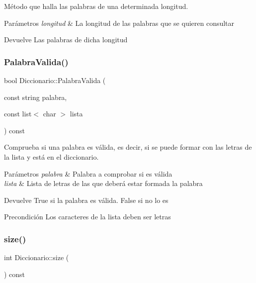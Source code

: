 Método que halla las palabras de una determinada longitud. 


\begin{DoxyParams}{Parámetros}
{\em longitud} & La longitud de las palabras que se quieren consultar \\
\hline
\end{DoxyParams}
\begin{DoxyReturn}{Devuelve}
Las palabras de dicha longitud 
\end{DoxyReturn}
\mbox{\label{classDiccionario_a8df85eb554f7539a5d690fd5b531627b}} 
\subsubsection{\texorpdfstring{Palabra\+Valida()}{PalabraValida()}}
{\footnotesize\ttfamily bool Diccionario\+::\+Palabra\+Valida (\begin{DoxyParamCaption}\item[{const string}]{palabra,  }\item[{const list$<$ char $>$}]{lista }\end{DoxyParamCaption}) const}



Comprueba si una palabra es válida, es decir, si se puede formar con las letras de la lista y está en el diccionario. 


\begin{DoxyParams}{Parámetros}
{\em palabra} & Palabra a comprobar si es válida \\
\hline
{\em lista} & Lista de letras de las que deberá estar formada la palabra \\
\hline
\end{DoxyParams}
\begin{DoxyReturn}{Devuelve}
True si la palabra es válida. False si no lo es 
\end{DoxyReturn}
\begin{DoxyPrecond}{Precondición}
Los caracteres de la lista deben ser letras 
\end{DoxyPrecond}
\mbox{\label{classDiccionario_a74ea14ecba52288b84ffc6ea1f2fba99}} 
\subsubsection{\texorpdfstring{size()}{size()}}
{\footnotesize\ttfamily int Diccionario\+::size (\begin{DoxyParamCaption}{ }\end{DoxyParamCaption}) const}



